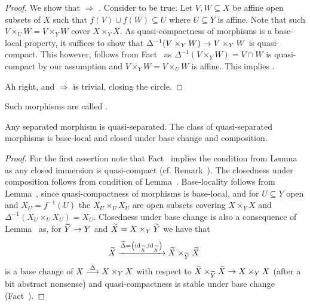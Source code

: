 \documentclass[a4paper,parskip=half,numbers=enddot, DIV=12]{scrreprt}
\begin{document}
\begin{proof}
    We show that  $\Rightarrow$ . Consider  to be true. Let $V, W\subseteq X$ be affine open subsets of $X$ such that $f(V)\cup f(W) \subseteq U$ where $U\subseteq Y$ is affine. Note that such $V\times_U W = V\times_Y W$ cover $X\times_Y X$. As quasi-compactness of morphisms is a base-local property, it suffices to show that $\Delta^{-1}(V\times_Y W)\morphism V\times_Y W$ is quasi-compact. This however, follows from Fact~ as $\Delta^{-1}(V\times_YW) = V\cap W$ is quasi-compact by our assumption and $V\times_Y W= V\times_U W$ is affine. This implies .
    
    Ah right, and  $\Rightarrow$  is trivial, closing the circle.
\end{proof}
\begin{defi}
    Such morphisms are called .
\end{defi}
\begin{fact}
    Any separated morphism is quasi-separated. The class of quasi-separated morphisms is base-local and closed under base change and composition.
\end{fact}
\begin{proof}
    For the first assertion note that Fact~ implies the condition from Lemma~ as any closed immersion is quasi-compact (cf. Remark~). The closedness under composition follows from condition  of Lemma~. Base-locality follows from Lemma~, since quasi-compactness of morphisms is base-local, and for $U\subseteq Y$ open and $X_U = f^{-1}(U)$ the $X_U\times_U X_U$ are open subsets covering $X\times_Y X$ and $\Delta^{-1}(X_U\times_U X_U) = X_U$. Closedness under base change is also a consequence of Lemma~ as, for $\snake Y\morphism Y$ and $\snake X = X\times_Y \snake Y$ we have that 
    \begin{align*}
    	\snake X \xrightarrow{\snake\Delta=\left(\id_{\snake X},\id_{\snake X}\right)} \snake X\times_{\snake Y}\snake X\;
    \end{align*}
    is a base change of $X\morphism[\Delta] X\times_Y X$ with respect to $\snake X\times_{\snake Y} \snake X \morphism X\times_Y X$ (after a bit abstract nonsense) and quasi-compactness is stable under base change (Fact~).
\end{proof}
\end{document}
